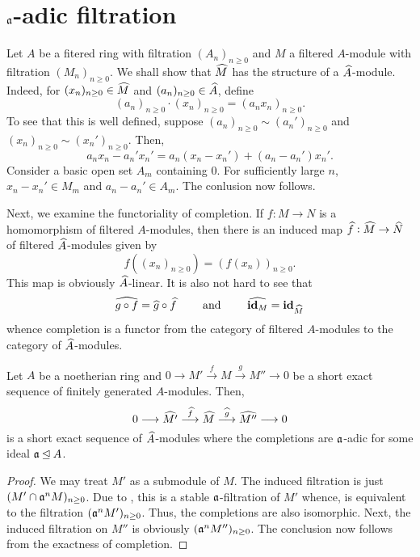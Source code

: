 \section{\texorpdfstring{$\mathfrak a$}{a}-adic filtration}

Let $A$ be a fitered ring with filtration $(A_n)_{n\ge 0}$ and $M$ a filtered $A$-module with filtration $(M_n)_{n\ge 0}$. We shall show that $\widehat{M}$ has the structure of a $\widehat{A}$-module. Indeed, for $(x_n)_{n\ge 0}\in\widehat{M}$ and $(a_n)_{n\ge 0}\in\widehat{A}$, define 
\begin{equation*}
    (a_n)_{n\ge 0}\cdot(x_n)_{n\ge 0} = (a_nx_n)_{n\ge 0}.
\end{equation*}
To see that this is well defined, suppose $(a_n)_{n\ge 0}\sim(a_n')_{n\ge0}$ and $(x_n)_{n\ge 0}\sim(x_n')_{n\ge 0}$. Then, 
\begin{equation*}
    a_nx_n - a_n'x_n' = a_n(x_n - x_n') + (a_n - a_n')x_n'.
\end{equation*}
Consider a basic open set $A_m$ containing $0$. For sufficiently large $n$, $x_n - x_n'\in M_m$ and $a_n - a_n'\in A_m$. The conlusion now follows.

Next, we examine the functoriality of completion. If $f: M\to N$ is a homomorphism of filtered $A$-modules, then there is an induced map $\widehat{f}: \widehat{M}\to\widehat{N}$ of filtered $\widehat{A}$-modules given by 
\begin{equation*}
    f((x_n)_{n\ge 0}) = (f(x_n))_{n\ge0}.
\end{equation*}
This map is obviously $\widehat{A}$-linear. It is also not hard to see that 
\begin{equation*}
    \widehat{g\circ f} = \widehat{g}\circ\widehat{f} \qquad\text{ and }\qquad\widehat{\mathbf{id}_M} = \mathbf{id}_{\widehat{M}}
\end{equation*}
whence completion is a functor from the category of filtered $A$-modules to the category of $\widehat{A}$-modules.

\begin{proposition}
    Let $A$ be a noetherian ring and $0\longrightarrow M'\stackrel{f}{\longrightarrow} M\stackrel{g}{\longrightarrow} M''\longrightarrow 0$ be a short exact sequence of finitely generated $A$-modules. Then, 
    \begin{equation*}
        0\longrightarrow\widehat{M'}\stackrel{\widehat{f}}{\longrightarrow}\widehat{M}\stackrel{\widehat{g}}{\longrightarrow}\widehat{M''}\longrightarrow 0
    \end{equation*}
    is a short exact sequence of $\widehat{A}$-modules where the completions are $\mathfrak a$-adic for some ideal $\mathfrak a\unlhd A$.
\end{proposition}
\begin{proof}
    We may treat $M'$ as a submodule of $M$. The induced filtration is just $(M'\cap\mathfrak a^n M)_{n\ge0}$. Due to , this is a stable $\mathfrak a$-filtration of $M'$ whence, is equivalent to the filtration $(\mathfrak a^n M')_{n\ge 0}$. Thus, the completions are also isomorphic. Next, the induced filtration on $M''$ is obviously $(\mathfrak a^n M'')_{n\ge 0}$. The conclusion now follows from the exactness of completion.
\end{proof}

